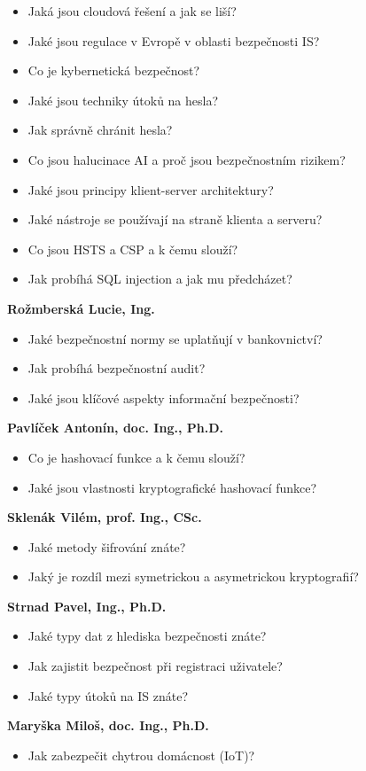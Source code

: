 \begin{profesorbox}
\begin{itemize}
  \item Jaká jsou cloudová řešení a jak se liší?
  \item Jaké jsou regulace v Evropě v oblasti bezpečnosti IS?
  \item Co je kybernetická bezpečnost?
  \item Jaké jsou techniky útoků na hesla?
  \item Jak správně chránit hesla?
  \item Co jsou halucinace AI a proč jsou bezpečnostním rizikem?
  \item Jaké jsou principy klient-server architektury?
  \item Jaké nástroje se používají na straně klienta a serveru?
  \item Co jsou HSTS a CSP a k čemu slouží?
  \item Jak probíhá SQL injection a jak mu předcházet?
\end{itemize}
\textbf{Rožmberská Lucie, Ing.}
\begin{itemize}
  \item Jaké bezpečnostní normy se uplatňují v bankovnictví?
  \item Jak probíhá bezpečnostní audit?
  \item Jaké jsou klíčové aspekty informační bezpečnosti?
\end{itemize}
\textbf{Pavlíček Antonín, doc. Ing., Ph.D.}
\begin{itemize}
  \item Co je hashovací funkce a k čemu slouží?
  \item Jaké jsou vlastnosti kryptografické hashovací funkce?
\end{itemize}
\textbf{Sklenák Vilém, prof. Ing., CSc.}
\begin{itemize}
  \item Jaké metody šifrování znáte?
  \item Jaký je rozdíl mezi symetrickou a asymetrickou kryptografií?
\end{itemize}
\textbf{Strnad Pavel, Ing., Ph.D.}
\begin{itemize}
  \item Jaké typy dat z hlediska bezpečnosti znáte?
  \item Jak zajistit bezpečnost při registraci uživatele?
  \item Jaké typy útoků na IS znáte?
\end{itemize}
\textbf{Maryška Miloš, doc. Ing., Ph.D.}
\begin{itemize}
  \item Jak zabezpečit chytrou domácnost (IoT)?

\end{itemize}
\end{profesorbox}

